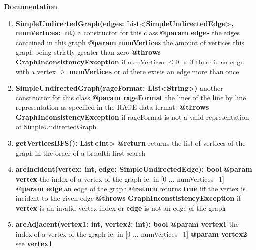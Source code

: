 	\textbf{Documentation}
	\begin{enumerate}[+]
		\item{
			\textbf{SimpleUndirectedGraph(edges: List<SimpleUndirectedEdge>, numVertices: int)} \newline
			a constructor for this class \newline
			\textbf{@param edges} the edges contained in this graph \newline
			\textbf{@param numVertices} the amount of vertices this graph being strictly greater than zero \newline
			\textbf{@throws GraphInconsistencyException} if numVertices $\leq 0$ or if there is an edge with a vertex $\geq$ \textbf{numVertices} or of there exists an edge more than once
		}
		\item{
			\textbf{SimpleUndirectedGraph(rageFormat: List<String>)} \newline
			another constructor for this class \newline
			\textbf{@param rageFormat} the lines of the line by line representation as specified in the RAGE data-format. \newline
			\textbf{@throws GraphInconsistencyException} if rageFormat is not a valid representation of SimpleUndirectedGraph
		}
		\item{
			\textbf{getVerticesBFS(): List<int>} \newline
			\textbf{@return} returns the list of vertices of the graph in the order of a breadth first search
		}
		\item{
			\textbf{areIncident(vertex: int, edge: SimpleUndirectedEdge): bool} \newline
			\textbf{@param vertex} the index of a vertex of the graph ie. in [0 ... numVertices$-1$]\newline
			\textbf{@param edge} an edge of the graph \newline 
			\textbf{@return} returns \textbf{true} iff the vertex is incident to the given edge \newline
			\textbf{@throws GraphInconstistencyException} if \textbf{vertex} is an invalid vertex index or \textbf{edge} is not an edge of the graph
		}
		\item{
			\textbf{areAdjacent(vertex1: int, vertex2: int): bool} \newline
			\textbf{@param vertex1} the index of a vertex of the graph ie. in [0 ... numVertices$-1$] \newline
			\textbf{@param vertex2} see \textbf{vertex1} \newline
}
\end{enumerate}
